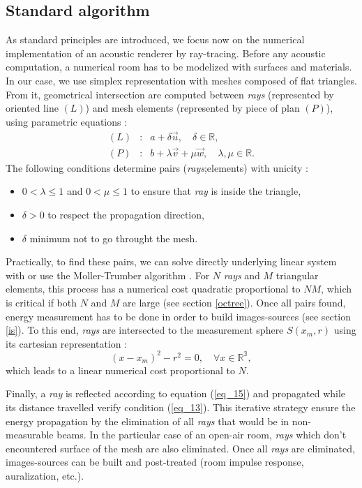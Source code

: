 \documentclass[AMA,STIX1COL]{WileyNJD-v2}
\begin{document}
\subsection{Standard algorithm}
As standard principles are introduced, we focus now on the numerical implementation of an acoustic renderer by ray-tracing. Before any acoustic computation, a numerical room has to be modelized with surfaces and materials. In our case, we use simplex representation with meshes composed of flat triangles. From it, geometrical intersection are computed between \textit{rays} (represented by oriented line $(L)$) and mesh elements (represented by piece of plan $(P)$), using parametric equations :
\begin{eqnarray}
(L) &:& a + \delta \overrightarrow{u}, \quad \delta \in \mathbb{R},  \\
(P) &:& b + \lambda \overrightarrow{v} + \mu \overrightarrow{w}, \quad \lambda, \mu \in \mathbb{R}.
\label{eq_20}
\end{eqnarray}    
The following conditions determine pairs (\textit{rays};elements)  with unicity : 
\begin{itemize}
\item $0 < \lambda \leq 1$ and $0 < \mu \leq 1$ to ensure that \textit{ray} is inside the triangle,
\item $\delta > 0$ to respect the propagation direction,
\item $\delta$ minimum not to go throught the mesh.
\end{itemize}
Practically, to find these pairs, we can solve directly underlying linear system with or use the Moller-Trumber algorithm \cite{moller}. For $N$ \textit{rays} and $M$ triangular elements, this process has a numerical cost quadratic proportional to $NM$, which is critical if both $N$ and $M$ are large (see section \ref{octree}). Once all pairs found, energy measurement has to be done in order to build images-sources (see section \ref{is}). To this end, \textit{rays} are intersected to the measurement sphere $S(x_m, r)$ using its cartesian representation :
\begin{equation}
(x-x_m)^2 - r^2 = 0, \quad \forall x \in  \mathbb{R^3},
\end{equation} 
which leads to a linear numerical cost proportional to $N$.


Finally, a \textit{ray} is reflected according to equation (\ref{eq_15}) and propagated while its distance travelled verify condition (\ref{eq_13}). This iterative strategy ensure the energy propagation by the elimination of all \textit{rays} that would be in non-measurable beams. In the particular case of an open-air room, \textit{rays} which don't encountered surface of the mesh are also eliminated. Once all \textit{rays} are eliminated, images-sources can be built and post-treated (room impulse response, auralization, etc.).
\end{document}
